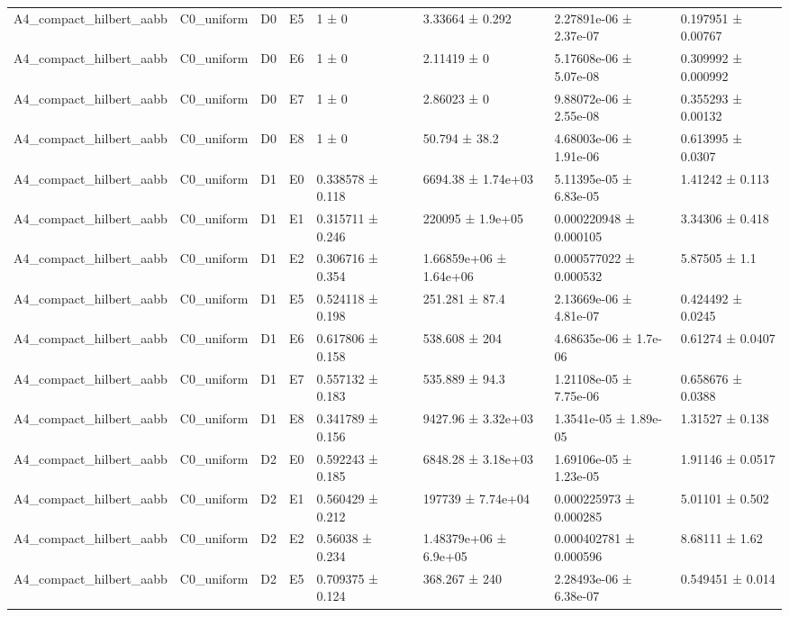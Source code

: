 \begin{table}
\begin{tabular}{lllllllll}
A4\_compact\_hilbert\_aabb & C0\_uniform & D0 & E5 & 1 ± 0 &  & 3.33664 ± 0.292 & 2.27891e-06 ± 2.37e-07 & 0.197951 ± 0.00767 \\
A4\_compact\_hilbert\_aabb & C0\_uniform & D0 & E6 & 1 ± 0 &  & 2.11419 ± 0 & 5.17608e-06 ± 5.07e-08 & 0.309992 ± 0.000992 \\
A4\_compact\_hilbert\_aabb & C0\_uniform & D0 & E7 & 1 ± 0 &  & 2.86023 ± 0 & 9.88072e-06 ± 2.55e-08 & 0.355293 ± 0.00132 \\
A4\_compact\_hilbert\_aabb & C0\_uniform & D0 & E8 & 1 ± 0 &  & 50.794 ± 38.2 & 4.68003e-06 ± 1.91e-06 & 0.613995 ± 0.0307 \\
A4\_compact\_hilbert\_aabb & C0\_uniform & D1 & E0 & 0.338578 ± 0.118 &  & 6694.38 ± 1.74e+03 & 5.11395e-05 ± 6.83e-05 & 1.41242 ± 0.113 \\
A4\_compact\_hilbert\_aabb & C0\_uniform & D1 & E1 & 0.315711 ± 0.246 &  & 220095 ± 1.9e+05 & 0.000220948 ± 0.000105 & 3.34306 ± 0.418 \\
A4\_compact\_hilbert\_aabb & C0\_uniform & D1 & E2 & 0.306716 ± 0.354 &  & 1.66859e+06 ± 1.64e+06 & 0.000577022 ± 0.000532 & 5.87505 ± 1.1 \\
A4\_compact\_hilbert\_aabb & C0\_uniform & D1 & E5 & 0.524118 ± 0.198 &  & 251.281 ± 87.4 & 2.13669e-06 ± 4.81e-07 & 0.424492 ± 0.0245 \\
A4\_compact\_hilbert\_aabb & C0\_uniform & D1 & E6 & 0.617806 ± 0.158 &  & 538.608 ± 204 & 4.68635e-06 ± 1.7e-06 & 0.61274 ± 0.0407 \\
A4\_compact\_hilbert\_aabb & C0\_uniform & D1 & E7 & 0.557132 ± 0.183 &  & 535.889 ± 94.3 & 1.21108e-05 ± 7.75e-06 & 0.658676 ± 0.0388 \\
A4\_compact\_hilbert\_aabb & C0\_uniform & D1 & E8 & 0.341789 ± 0.156 &  & 9427.96 ± 3.32e+03 & 1.3541e-05 ± 1.89e-05 & 1.31527 ± 0.138 \\
A4\_compact\_hilbert\_aabb & C0\_uniform & D2 & E0 & 0.592243 ± 0.185 &  & 6848.28 ± 3.18e+03 & 1.69106e-05 ± 1.23e-05 & 1.91146 ± 0.0517 \\
A4\_compact\_hilbert\_aabb & C0\_uniform & D2 & E1 & 0.560429 ± 0.212 &  & 197739 ± 7.74e+04 & 0.000225973 ± 0.000285 & 5.01101 ± 0.502 \\
A4\_compact\_hilbert\_aabb & C0\_uniform & D2 & E2 & 0.56038 ± 0.234 &  & 1.48379e+06 ± 6.9e+05 & 0.000402781 ± 0.000596 & 8.68111 ± 1.62 \\
A4\_compact\_hilbert\_aabb & C0\_uniform & D2 & E5 & 0.709375 ± 0.124 &  & 368.267 ± 240 & 2.28493e-06 ± 6.38e-07 & 0.549451 ± 0.014 \\

\end{tabular}
\end{table}
